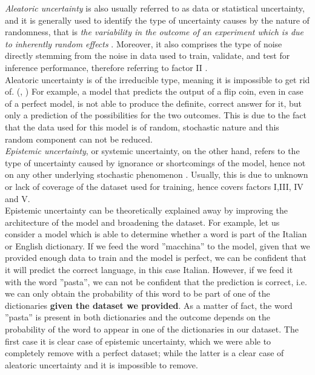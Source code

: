 \textit{Aleatoric uncertainty} is also usually referred to as data or statistical uncertainty, and it is generally used to identify the type of uncertainty causes by the nature of randomness, that is \textit{ the variability in the outcome of an experiment which is due to inherently random effects} \cite{Separation_uncer}. Moreover, it also comprises the type of noise directly stemming from the noise in data used to train, validate, and test for inference performance, therefore referring to factor II \cite{gawlikowski2021survey} \cite{DBLP:journals/corr/abs-1811-01412}.  \\
Aleatoric uncertainty is of the irreducible type, meaning it is impossible to get rid of. (\cite{DBLP:journals/corr/KendallG17}, \cite{Separation_uncer}) For example, a model that predicts the output of a flip coin, even in case of a perfect model, is not able to produce the definite, correct answer for it, but only a prediction of the possibilities for the two outcomes. This is due to the fact that the data used for this model is of random, stochastic nature and this random component can not be reduced. \cite{Separation_uncer}\\
\textit{Epistemic uncertainty}, or systemic uncertainty, on the other hand, refers to the type of uncertainty caused by ignorance or shortcomings of the model, hence not on any other underlying stochastic phenomenon \cite{DBLP:journals/corr/abs-1811-01412}. Usually, this is due to unknown or lack of coverage of the dataset used for training, hence covers factors I,III, IV and V. \\
Epistemic uncertainty can be theoretically explained away by improving the architecture of the model and broadening the dataset.
For example, let us consider a model which is able to determine whether a word is part of the Italian or English dictionary. If we feed the word ''macchina'' to the model, given that we provided enough data to train and the model is perfect, we can be confident that it will predict the correct language, in this case Italian. However, if we feed it with the word ''pasta'', we can not be confident that the prediction is correct, i.e. we can only obtain the probability of this word to be part of one of the dictionaries \textbf{given the dataset we provided}. As a matter of fact, the word ''pasta'' is present in both dictionaries and the outcome depends on the probability of the word to appear in one of the dictionaries in our dataset. The first case it is clear case of epistemic uncertainty, which we were able to completely remove with a perfect dataset; while the latter is a clear case of aleatoric uncertainty and it is impossible to remove. 
